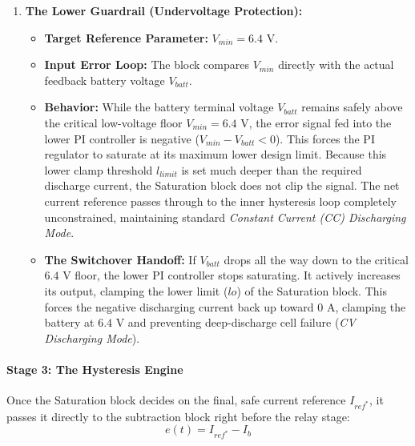 \begin{enumerate}
    \item \textbf{The Lower Guardrail (Undervoltage Protection):}
    \begin{itemize}
        \item \textbf{Target Reference Parameter:} $V_{min} = 6.4\text{ V}$.
        \item \textbf{Input Error Loop:} The block compares $V_{min}$ directly with the actual feedback battery voltage $V_{batt}$.
        \item \textbf{Behavior:} While the battery terminal voltage $V_{batt}$ remains safely above the critical low-voltage floor $V_{min} = 6.4\text{ V}$, the error signal fed into the lower PI controller is negative ($V_{min} - V_{batt} < 0$). This forces the PI regulator to saturate at its maximum lower design limit. Because this lower clamp threshold $l_{limit}$ is set much deeper than the required discharge current, the Saturation block does not clip the signal. The net current reference passes through to the inner hysteresis loop completely unconstrained, maintaining standard \textit{Constant Current (CC) Discharging Mode}.
        \item \textbf{The Switchover Handoff:} If $V_{batt}$ drops all the way down to the critical $6.4\text{ V}$ floor, the lower PI controller stops saturating. It actively increases its output, clamping the lower limit ($lo$) of the Saturation block. This forces the negative discharging current back up toward $0\text{ A}$, clamping the battery at $6.4\text{ V}$ and preventing deep-discharge cell failure (\textit{CV Discharging Mode}).
    \end{itemize}
\end{enumerate}

\paragraph{Stage 3: The Hysteresis Engine}
Once the Saturation block decides on the final, safe current reference $I_{ref^*}$, it passes it directly to the subtraction block right before the relay stage:
\begin{equation}
   e(t) = I_{ref^*} - I_{b}
\end{equation}

